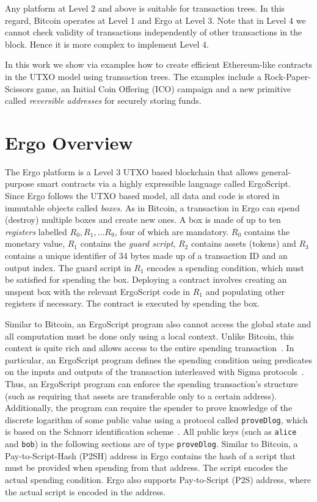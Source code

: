 \documentclass[runningheads]{llncs}
\newcommand{\langname}{ErgoScript\xspace}
\begin{document}
Any platform at Level 2 and above is suitable for transaction trees. In this regard, Bitcoin operates at Level 1 and Ergo at Level 3. Note that in Level 4 we cannot check validity of transactions independently of other transactions in the block. Hence it is more complex to implement Level 4. 


In this work we show via examples how to create efficient Ethereum-like contracts in the UTXO model using transaction trees. 
The examples include a Rock-Paper-Scissors game, an Initial Coin Offering (ICO) campaign and a new primitive called {\em reversible addresses} for securely storing funds. 

\section{Ergo Overview}
\label{ergo-overview}

The Ergo platform is a Level 3 UTXO based blockchain that allows general-purpose smart contracts via a highly expressible language called \langname. 
Since Ergo follows the UTXO based model, all data and code is stored in immutable objects called {\em boxes}. As in Bitcoin, a transaction in Ergo can spend (destroy) multiple boxes and create new ones. 
A box is made of up to ten {\em registers} labelled $R_0, R_1,\ldots R_9$, four of which are mandatory. $R_0$ contains the monetary value, $R_1$ contains the {\em guard script}, $R_2$ contains assets (tokens) and $R_3$ contains a unique identifier of 34 bytes made up of a transaction ID and an output index. The guard script in $R_1$ encodes a spending condition, which must be satisfied for spending the box. Deploying a contract involves creating an unspent box with the relevant \langname code in $R_1$ and populating other registers if necessary. The contract is executed by spending the box. 


Similar to Bitcoin, an \langname program also cannot access the global state and all computation must be done only using a local context. Unlike Bitcoin, this context is quite rich and allows access to the entire spending transaction~\cite{tutorial}. 
In particular, an \langname program defines the spending condition using predicates on the inputs and outputs of the transaction interleaved with Sigma protocols~\cite{Dam10}. Thus, an \langname program can enforce the spending transaction's structure (such as requiring that assets are transferable only to a certain address). Additionally, the program can require the spender to prove knowledge of the discrete logarithm of some public value using a protocol called \texttt{proveDlog}, which is based on the Schnorr identification scheme~\cite{Dam10}. All public keys (such as \texttt{alice} and \texttt{bob}) in the following sections are of type \texttt{proveDlog}. Similar to Bitcoin, a Pay-to-Script-Hash (P2SH) address in Ergo contains the hash of a script that must be provided when spending from that address. The script encodes the actual spending condition. Ergo also supports Pay-to-Script (P2S) address, where the actual script is encoded in the address. 
\end{document}

